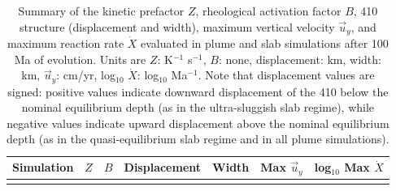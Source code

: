 \documentclass[draft,linenumbers]{agujournal2019}
\newcounter{none}
\begin{document}
\begin{longtable}[]{@{}
  >{\raggedright\arraybackslash}p{}
  >{\raggedleft\arraybackslash}p{}
  >{\raggedleft\arraybackslash}p{}
  >{\raggedleft\arraybackslash}p{}
  >{\raggedleft\arraybackslash}p{}
  >{\raggedleft\arraybackslash}p{}
  >{\raggedleft\arraybackslash}p{}@{}}
\caption{Summary of the kinetic prefactor \(Z\), rheological activation
factor \(B\), 410 structure (displacement and width), maximum vertical
velocity \(\vec{u}_y\), and maximum reaction rate \(\dot{X}\) evaluated
in plume and slab simulations after 100 Ma of evolution. Units are
\(Z\): K\(^{-1}\) s\(^{-1}\), \(B\): none, displacement: km, width: km,
\(\vec{u}_y\): cm/yr, log\(_{10}\) \(\dot{X}\): log\(_{10}\)
Ma\(^{-1}\). Note that displacement values are signed: positive values
indicate downward displacement of the 410 below the nominal equilibrium
depth (as in the ultra-sluggish slab regime), while negative values
indicate upward displacement above the nominal equilibrium depth (as in
the quasi-equilibrium slab regime and in all plume
simulations).}\label{tbl:depth-profile-summary}\tabularnewline
\toprule\noalign{}
\begin{minipage}[b]{\linewidth}\raggedright
Simulation
\end{minipage} & \begin{minipage}[b]{\linewidth}\raggedleft
\(Z\)
\end{minipage} & \begin{minipage}[b]{\linewidth}\raggedleft
\(B\)
\end{minipage} & \begin{minipage}[b]{\linewidth}\raggedleft
Displacement
\end{minipage} & \begin{minipage}[b]{\linewidth}\raggedleft
Width
\end{minipage} & \begin{minipage}[b]{\linewidth}\raggedleft
Max \(\vec{u}_y\)
\end{minipage} & \begin{minipage}[b]{\linewidth}\raggedleft
log\(_{10}\) Max \(\dot{X}\)
\end{minipage} \\
\midrule\noalign{}
\endfirsthead
\toprule\noalign{}

\end{longtable}
\end{document}

